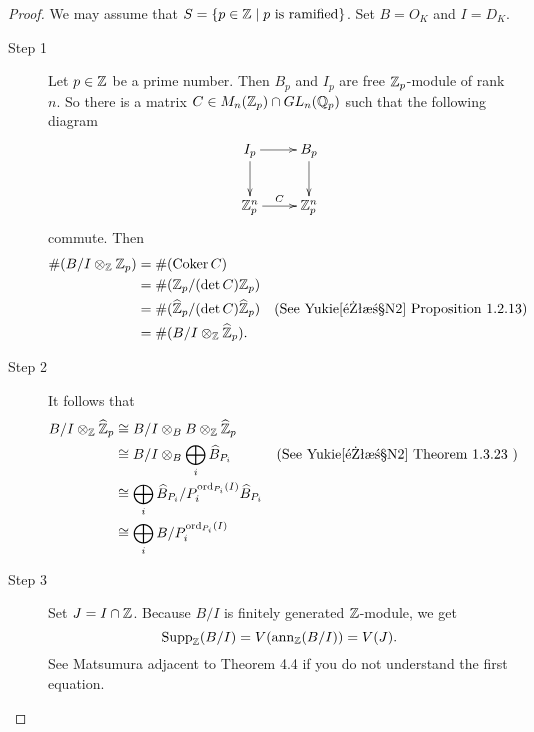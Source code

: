 \begin{proof}
  We may assume that $S = \left\{ p \in {\mathbb Z} \mathrel{} \middle| \mathrel{} \text{$p$ is ramified}  \right\}$. Set $B = O_K$ and $I = D_K$.
\begin{description}
  \item[Step 1] Let $p \in {\mathbb Z}$ be a prime number. Then $B_p$ and $I_p$ are free ${\mathbb Z}_p$-module of rank $n$. So there is a matrix $C \in M_n({\mathbb Z}_p) \cap GL_n({\mathbb Q}_p)$ such that the following diagram
  \[
  \xymatrix{
  I_p \ar[r] \ar[d]  & B_p \ar[d] \\
  \Z_p^n \ar[r]^-C & \Z_p^n
  }
  \]
  commute. Then
  \begin{align*}
    \#(B/I \otimes_{{\mathbb Z}} {\mathbb Z}_p) &= \#(\operatorname{Coker} C) \\
    &= \#({\mathbb Z}_p / (\det C) {\mathbb Z}_p) \\
    &= \#(\widehat{{\mathbb Z}}_p / (\det C) \widehat{{\mathbb Z}}_p) &(\text{See Yukie\cite{雪江N2} Proposition 1.2.13}) \\
    &= \#(B/I \otimes_{{\mathbb Z}} \widehat{{\mathbb Z}}_p).
  \end{align*}
\item[Step 2] It follows that
  \begin{align*}
    B/I \otimes_{{\mathbb Z}} \widehat{{\mathbb Z}}_p &\cong   B/I \otimes_B B \otimes_{{\mathbb Z}} \widehat{{\mathbb Z}}_p \\
    &\cong   B/I \otimes_B  \bigoplus_i \widehat{B}_{P_i} &(\text{See Yukie\cite{雪江N2} Theorem 1.3.23 }) \\
    &\cong \bigoplus_i \widehat{B}_{P_i} / P_i^{\operatorname{ord}_{P_i}(I)} \widehat{B}_{P_i} \\
    &\cong \bigoplus_i B/P_i^{\operatorname{ord}_{P_i}(I) }
    \end{align*}
\item[Step 3] Set $J = I \cap {\mathbb Z}$. Because $B/I$ is finitely generated ${\mathbb Z}$-module, we get
\[
\operatorname{Supp}_{{\mathbb Z}} (B/I) = V(\operatorname{ann}_{{\mathbb Z}} (B/I)) = V(J).
\]
See Matsumura\cite{松村} adjacent to Theorem 4.4 if you do not understand the first equation.


\end{description}
\end{proof}
